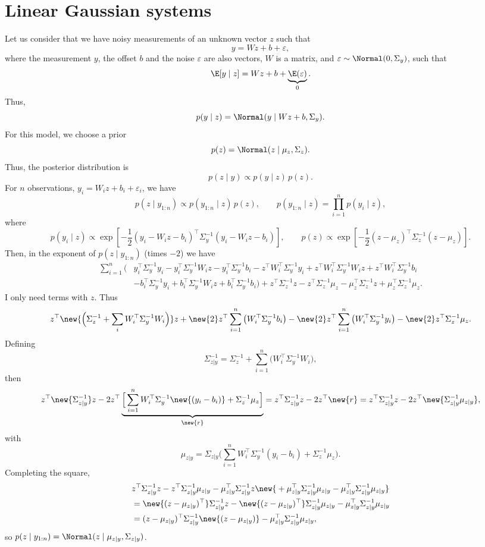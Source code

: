 \section{Linear Gaussian systems}
Let us consider that we have noisy measurements of an unknown vector $z$ such that
\[
y = W z + b + \varepsilon,
\]
where the measurement $y$, the offset $b$ and the noise $\varepsilon$ are also vectors, $W$ is a matrix, and $\varepsilon \sim \Normal(0, \Sigma_y)$, such that
\[
\E[y \mid z] = W z + b + \underbrace{\E(\varepsilon)}_{0}.
\]
Thus,
\[
p(y \mid z) = \Normal(y \mid W z + b, \Sigma_y).
\]
For this model, we choose a prior
\[
p(z) = \Normal(z \mid \mu_z, \Sigma_z).
\]
Thus, the posterior distribution is
\[
p(z \mid y) \propto p(y \mid z)\,p(z).
\]
For $n$ observations, $y_i = W_i z + b_i + \varepsilon_i$, we have
\[
p(z \mid y_{1:n}) \propto p(y_{1:n} \mid z)\,p(z),
\qquad
p(y_{1:n} \mid z) = \prod_{i=1}^{n}p(y_i \mid z),
\]
where
\[
p(y_i \mid z) \propto \exp\left[-\frac12(y_i - W_i z - b_i)^{\top}\Sigma_y^{-1}(y_i - W_i z - b_i)\right],
\qquad
p(z) \propto \exp\left[-\frac12(z - \mu_z)^{\top}\Sigma_z^{-1}(z - \mu_z)\right].
\]
Then, in the exponent of $p(z \mid y_{1:n})$ (times $-2$) we have
\begin{align*}
\sum_{i=1}^{n}\Big(&y_i^{\top}\Sigma_y^{-1}y_i - y_i^{\top}\Sigma_y^{-1}W_i z - y_i^{\top}\Sigma_y^{-1}b_i
- z^{\top}W_i^{\top}\Sigma_y^{-1}y_i + z^{\top}W_i^{\top}\Sigma_y^{-1}W_i z + z^{\top}W_i^{\top}\Sigma_y^{-1}b_i\\
&- b_i^{\top}\Sigma_y^{-1}y_i + b_i^{\top}\Sigma_y^{-1}W_i z + b_i^{\top}\Sigma_y^{-1}b_i\Big)
+ z^{\top}\Sigma_z^{-1}z - z^{\top}\Sigma_z^{-1}\mu_z - \mu_z^{\top}\Sigma_z^{-1}z + \mu_z^{\top}\Sigma_z^{-1}\mu_z.
\end{align*}
I only need terms with $z$. Thus
\[
z^{\top}\new{\Big(\Sigma_z^{-1} + \sum_i W_i^{\top}\Sigma_y^{-1}W_i\Big)}z
+ \new{2}z^{\top}\sum_{i=1}^{n}\big(W_i^{\top}\Sigma_y^{-1}b_i\big) - \new{2}z^{\top}\sum_{i=1}^{n}\big(W_i^{\top}\Sigma_y^{-1}y_i\big) - \new{2}z^{\top}\Sigma_z^{-1}\mu_z.
\]
Defining
\[
\Sigma_{z|y}^{-1} = \Sigma_z^{-1} + \sum_{i=1}^{n}\big(W_i^{\top}\Sigma_y^{-1}W_i\big),
\]
then
\[
z^{\top}\new{\Sigma_{z|y}^{-1}}z - 2z^{\top}\underbrace{\Big[\sum_{i=1}^{n}W_i^{\top}\Sigma_y^{-1}\new{(y_i - b_i)} + \Sigma_z^{-1}\mu_z\Big]}_{\new{r}}
= z^{\top}\Sigma_{z|y}^{-1}z - 2z^{\top}\new{r}
= z^{\top}\Sigma_{z|y}^{-1}z - 2z^{\top}\new{\Sigma_{z|y}^{-1}\mu_{z|y}},
\]
with
\[
\mu_{z|y} = \Sigma_{z|y}\Big(\sum_{i=1}^{n}W_i^{\top}\Sigma_y^{-1}(y_i - b_i) + \Sigma_z^{-1}\mu_z\Big).
\]
Completing the square,
\begin{align*}
&z^{\top}\Sigma_{z|y}^{-1}z - z^{\top}\Sigma_{z|y}^{-1}\mu_{z|y} - \mu_{z|y}^{\top}\Sigma_{z|y}^{-1}z \new{{}+ \mu_{z|y}^{\top}\Sigma_{z|y}^{-1}\mu_{z|y} - \mu_{z|y}^{\top}\Sigma_{z|y}^{-1}\mu_{z|y}}\\
&= \new{(z - \mu_{z|y})^{\top}}\Sigma_{z|y}^{-1}z - \new{(z - \mu_{z|y})^{\top}}\Sigma_{z|y}^{-1}\mu_{z|y} - \mu_{z|y}^{\top}\Sigma_{z|y}^{-1}\mu_{z|y}\\
&= (z - \mu_{z|y})^{\top}\Sigma_{z|y}^{-1}\new{(z - \mu_{z|y})} - \mu_{z|y}^{\top}\Sigma_{z|y}^{-1}\mu_{z|y},
\end{align*}
so $p(z \mid y_{1:n}) = \Normal(z \mid \mu_{z|y}, \Sigma_{z|y})$.

